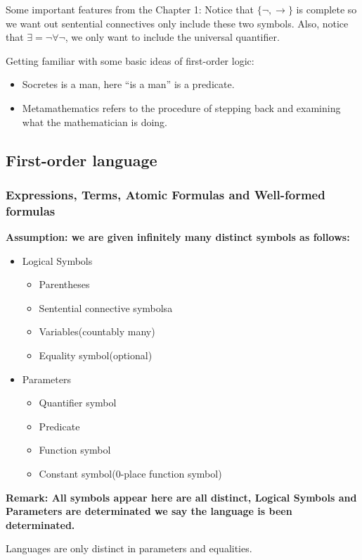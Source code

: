 \documentclass[11pt]{article}
\begin{document}
Some important features from the Chapter 1: Notice that \(\{\neg, \to\}\) is complete so we want out sentential connectives only include these two symbols. Also, notice that \(\exists = \neg \forall \neg\), we only want to include the universal quantifier.

Getting familiar with some basic ideas of first-order logic:
\begin{itemize}
\item Socretes is a man, here ``is a man'' is a predicate.
\item Metamathematics refers to the procedure of stepping back and examining what the mathematician is doing.
\end{itemize}
\subsection{First-order language}
\label{sec:org01f5aae}
\subsubsection{Expressions, Terms, Atomic Formulas and Well-formed formulas}
\label{sec:org73a438d}
\textbf{Assumption: we are given infinitely many distinct symbols as follows:}
\begin{itemize}
\item Logical Symbols
\begin{itemize}
\item Parentheses
\item Sentential connective symbolsa
\item Variables(countably many)
\item Equality symbol(optional)
\end{itemize}
\item Parameters
\begin{itemize}
\item Quantifier symbol
\item Predicate
\item Function symbol
\item Constant symbol(0-place function symbol)
\end{itemize}
\end{itemize}
\textbf{Remark: All symbols appear here are all distinct, Logical Symbols and Parameters are determinated we say the language is been determinated.}

\begin{proposition}
Languages are only distinct in parameters and equalities.
\end{proposition}
\end{document}
